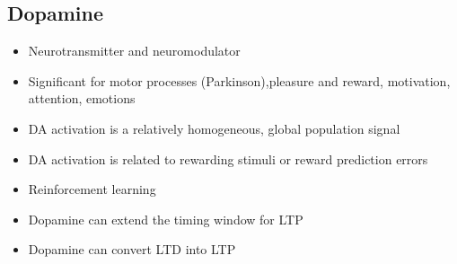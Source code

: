 \documentclass[english,11pt]{article}
\begin{document}
\subsection{Dopamine}
\begin{itemize}
\item Neurotransmitter and neuromodulator
\item Significant for motor processes (Parkinson),pleasure and reward, motivation, attention, emotions
\item DA activation is a relatively
homogeneous, global population signal
\item DA activation is related to rewarding stimuli or reward prediction errors
\item Reinforcement learning
\item Dopamine can extend
the timing window for LTP
\item Dopamine can convert LTD into LTP
\end{itemize}
\end{document}
